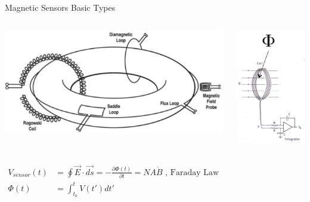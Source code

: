 \documentclass{beamer}
\begin{document}
\begin{frame}{Magnetic Sensors } {Basic Types}

 \begin{columns}
 	\begin{center}
	\includegraphics[width=.8\columnwidth]{indsensors.png}
	\end{center}	
 	\begin{center}
	\includegraphics[trim = 1mm 25mm 3mm 5mm, clip, width=.8\columnwidth]{magsensor.png}
	\end{center}	

\end{columns}
$ 
 \begin{array}{cl}    
 V_{sensor} (t) &= \oint \vec{E} \cdot \vec{d s}  =
  - \frac{\partial \Phi(t)}{\partial t} = NA\dot {B}\textrm{ , Faraday Law} \\
\Phi(t) &= \int_{t_0}^t V(t') d t'
\end{array}
$
  
\end{frame}
\end{document}
